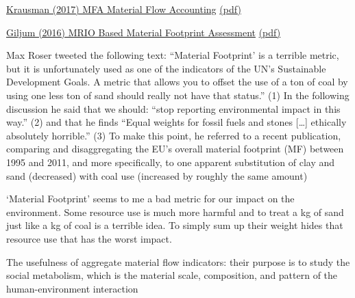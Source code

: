 \documentclass[
]{book}
\begin{document}
\href{https://www.annualreviews.org/doi/10.1146/annurev-environ-102016-060726}{Krausman (2017) MFA Material Flow Accounting}
\href{pdf/Krausman_2017_MFA.pdf}{(pdf)}

\href{https://journalofeconomicstructures.springeropen.com/articles/10.1186/s40008-016-0048-5\#Abs1}{Giljum (2016) MRIO Based Material Footprint Assessment}
\href{pdf/Giljum_2016_MRIO_based_Material_Footprint.pdf}{(pdf)}

Max Roser tweeted the following text: ``Material Footprint' is a terrible metric, but it is unfortunately used as one of the indicators of the UN's Sustainable Development Goals. A metric that allows you to offset the use of a ton of coal by using one less ton of sand should really not have that status.'' (1) In the following discussion he said that we should: ``stop reporting environmental impact in this way.'' (2) and that he finds ``Equal weights for fossil fuels and stones {[}\ldots{]} ethically absolutely horrible.'' (3) To make this point, he referred to a recent publication, comparing and disaggregating the EU's overall material footprint (MF) between 1995 and 2011, and more specifically, to one apparent substitution of clay and sand (decreased) with coal use (increased by roughly the same amount)

`Material Footprint' seems to me a bad metric for our impact on the environment.
Some resource use is much more harmful and to treat a kg of sand just like a kg of coal is a terrible idea.
To simply sum up their weight hides that resource use that has the worst impact.

The usefulness of aggregate material flow indicators: their purpose is to study the social metabolism, which is the material scale, composition, and pattern of the human-environment interaction
\end{document}

